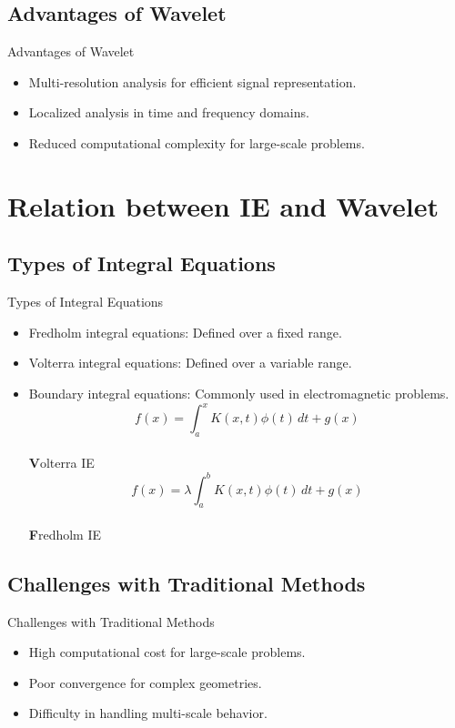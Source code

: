 \documentclass{beamer}
\begin{document}
\subsection{Advantages of Wavelet}
\begin{frame}{Advantages of Wavelet}
    \begin{itemize}
        \item Multi-resolution analysis for efficient signal representation.
        \item Localized analysis in time and frequency domains.
        \item Reduced computational complexity for large-scale problems.
    \end{itemize}
\end{frame}

\section{Relation between IE and Wavelet}
\subsection{Types of Integral Equations}
\begin{frame}{Types of Integral Equations}
    \begin{itemize}
        \item Fredholm integral equations: Defined over a fixed range.
        \item Volterra integral equations: Defined over a variable range.
        \item Boundary integral equations: Commonly used in electromagnetic problems.
        \vfill 
        \centering
        \[
              f(x) = \int_a^x K(x, t)\phi(t) \,dt + g(x)
        \]
        \\[0.2cm]
        {\small \textbf Volterra IE}
        \[
              f(x) = \lambda \int_a^b K(x, t)\phi(t) \,dt + g(x)
        \]
        \\[0.2cm]
        {\small \textbf Fredholm IE}
    \end{itemize}
\end{frame}

\subsection{Challenges with Traditional Methods}
\begin{frame}{Challenges with Traditional Methods}
    \begin{itemize}
        \item High computational cost for large-scale problems.
        \item Poor convergence for complex geometries.
        \item Difficulty in handling multi-scale behavior.
    \end{itemize}
\end{frame}
\end{document}
